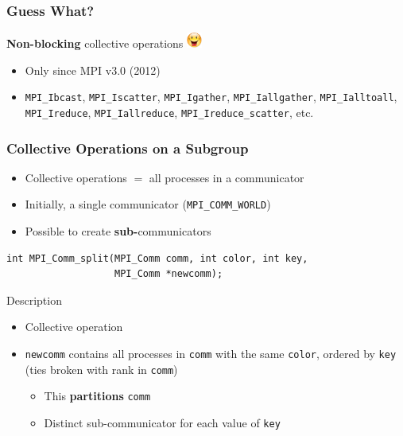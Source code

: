 \documentclass[xcolor={x11names,svgnames,psnames}]{beamer}
\newcommand{\smiley}{\includegraphics[width=0.5cm,trim=0 17mm 0 0]{content}}
\begin{document}

\begin{frame}[fragile=singleslide]
  \frametitle{Guess What?}
  
  \begin{block}{\textbf{Non-blocking} collective operations \smiley}
    \begin{itemize}
    \item Only since MPI v3.0 (2012)
    \item \texttt{MPI_Ibcast}, \texttt{MPI_Iscatter}, \texttt{MPI_Igather}, \texttt{MPI_Iallgather}, \texttt{MPI_Ialltoall}, \texttt{MPI_Ireduce}, \texttt{MPI_Iallreduce}, \texttt{MPI_Ireduce_scatter}, etc.
    \end{itemize}
  \end{block}
\end{frame}


\begin{frame}[fragile=singleslide]
  \frametitle{Collective Operations on a Subgroup}

  \begin{itemize}
  \item Collective operations $=$ all processes in a \alert{communicator}
  \item Initially, a single communicator (\texttt{MPI_COMM_WORLD})
  \item Possible to create \textbf{sub-}communicators
  \end{itemize}
  
\begin{verbatim}
int MPI_Comm_split(MPI_Comm comm, int color, int key,
                   MPI_Comm *newcomm);
\end{verbatim}

  \begin{block}{Description}
    \begin{itemize}
    \item Collective operation
    \item \texttt{newcomm} contains all processes in \texttt{comm} with the same \texttt{color}, ordered by \texttt{key} (ties broken with rank in \texttt{comm})
      \begin{itemize}
      \item This \textbf{partitions} \texttt{comm}
      \item Distinct sub-communicator for each value of \texttt{key}
      \end{itemize}
    \end{itemize}
  \end{block}
\end{frame}
\end{document}
